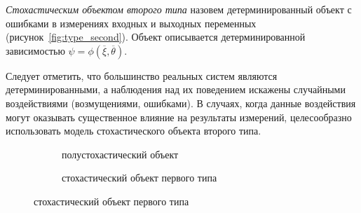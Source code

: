 \emph{Стохастическим объектом второго типа} назовем детерминированный объект с ошибками
в измерениях входных и выходных переменных (рисунок~\ref{fig:type_second}).
Объект описывается детерминированной зависимостью \( \psi = \phi(\overline{\xi}, \overline{\theta}) \).

Следует отметить, что большинство реальных систем являются детерминированными,
а наблюдения над их поведением искажены случайными воздействиями (возмущениями, ошибками).
В случаях, когда данные воздействия могут оказывать существенное влияние на результаты измерений,
целесообразно использовать модель стохастического объекта второго типа.

\begin{figure}[p]
  \begin{subfigure}[b]{\linewidth}
    \centering
    \caption{полустохастический объект}\label{fig:type_half}
  \end{subfigure}

  \vspace{2\baselineskip}
  \begin{subfigure}[b]{\linewidth}
    \centering
    \caption{стохастический объект первого типа}\label{fig:type_first}
  \end{subfigure}


\end{figure}
